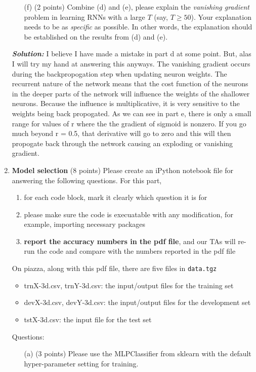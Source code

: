 \documentclass[10pt]{article}
\begin{document}
\begin{enumerate}
\begin{itemize}
  \item[(f)] (2 points) Combine (d) and (e), please explain the \emph{vanishing gradient} problem in learning RNNs with a large $T$ (say, $T\geq 50$). Your explanation needs to be as \emph{specific} as possible. In other words, the explanation should be established on the results from (d) and (e).
  \end{itemize} \par
       \hspace{\parindent}\textit{\textbf{Solution:}}
I believe I have made a mistake in part d at some point. But, alas I will try my hand at answering this anyways. The vanishing gradient occurs during the backpropogation step when updating neuron weights. The recurrent nature of the network means that the cost function of the neurons in the deeper parts of the network will influence the weights of the shallower neurons. Because the influence is multiplicative, it is very sensitive to the weights being back propogated. As we can see in part e, there is only a small range for values of r where the the gradient of sigmoid is nonzero. If you go much beyond r = 0.5, that derivative will go to zero and this will then propogate back through the network causing an exploding or vanishing gradient. 

\item \textbf{Model selection} (8 points) Please create an iPython notebook file for answering the following questions. For this part, 
  \begin{enumerate}
  \item for each code block, mark it clearly which question it is for
  \item please make sure the code is execuatable with any modification, for example, importing necessary packages
  \item \textbf{report the accuracy numbers in the pdf file}, and our TAs will re-run the code and compare with the numbers reported in the pdf file
  \end{enumerate}
  On piazza, along with this pdf file, there are five files in \texttt{data.tgz}
  \begin{itemize}
  \item trnX-3d.csv, trnY-3d.csv: the input/output files for the training set
  \item devX-3d.csv, devY-3d.csv: the input/output files for the development set
  \item tstX-3d.csv: the input file for the test set
  \end{itemize}
  Questions:
  \begin{itemize}
  \item[(a)] (3 points) Please use the {MLPClassifier} from sklearn with the default hyper-parameter setting for training.
  

\end{itemize}
\end{enumerate}
\end{document}
